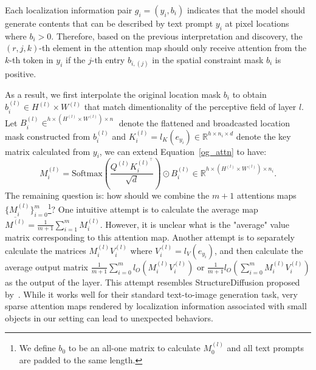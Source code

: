 Each localization information pair $g_i = (y_i, b_i)$ indicates that the model should generate contents that can be described by text prompt $y_i$ at pixel locations where $b_i > 0$. Therefore, based on the previous interpretation and discovery, the $(r,j,k)$-th element in the attention map should only receive attention from the $k$-th token in $y_i$ if the $j$-th entry $b_{i,(j)}$ in the spatial constraint mask $b_i$ is positive.

As a result, we first interpolate the original location mask $b_i$ to obtain $b_i^{(l)} \in H^{(l)} \times W^{(l)}$ that match dimentionality of the perceptive field of layer $l$. Let $B_i^{(l)} \in ^{h\times (H^{(l)} \times W^{(l)}) \times n}$ denote the flattened and broadcasted location mask constructed from $b_i^{(l)}$ and $K_i^{(l)} = l_K(e_{y_i}) \in \mathbb{R}^{h\times n_i \times d}$ denote the key matrix calculated from $y_i$, we can extend Equation~\ref{og_attn} to have:
\begin{equation}
    M_i^{(l)} = \text{Softmax}(\frac{Q^{(l)}K_i^{(l)^\top}}{\sqrt{d}}) \odot B_i^{(l)} \in \mathbb{R}^{h\times (H^{(l)} \times W^{(l)}) \times n_i}.
    \label{attn_i}
\end{equation}
The remaining question is: how should we combine the $m+1$ attentions maps $\{M_i^{(l)}\}_{i=0}^m$\footnote{We define $b_0$ to be an all-one matrix to calculate $M_0^{(l)}$ and all text prompts are padded to the same length.}? One intuitive attempt is to calculate the average map $\overline{M^{(l)}} = \frac{1}{m+1}\sum_{i=1}^m M_i^{(l)}$. However, it is unclear what is the "average" value matrix corresponding to this attention map. Another attempt is to separately calculate the matrices $M_i^{(l)}V_i^{(l)}$ where $V_i^{(l)} = l_V(e_{y_i})$, and then calculate the average output matrix $\frac{1}{m+1}\sum_{i=0}^m l_O(M_i^{(l)}V_i^{(l)})$ or $\frac{1}{m+1}l_O(\sum_{i=0}^m M_i^{(l)}V_i^{(l)})$ as the output of the layer. This attempt resembles StructureDiffusion proposed by~\citet{structurediffusion}. While it works well for their standard text-to-image generation task, very sparse attention maps rendered by localization information associated with small objects in our setting can lead to unexpected behaviors. %

